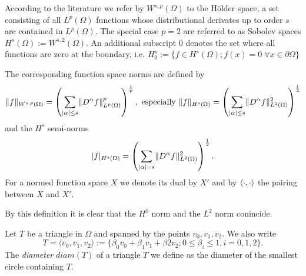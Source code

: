 \begin{definition} \label{def: function spaces and norms}
According to the literature we refer by $W^{s,p}(\Omega)$ to the H\"older space, a set consisting of all $L^p(\Omega)$ functions whose distributional derivates up to order $s$ are contained in $L^ p(\Omega)$.
 The special case $p=2$ are referred to as Sobolev spaces $H^s(\Omega):=W^{s,2}(\Omega)$. An additional subscript $0$ denotes the set where all functions are zero at the boundary, i.e. $H^s_0 :=\{f \in H^s(\Omega); f(x)=0 \; \forall x \in \partial \Omega\}$

The corresponding function space norms are defined by
\[
	\lVert f \rVert _{W^{s,p}(\Omega)} = \left( \sum_{|\alpha| \leq s} \lVert D^\alpha f \rVert^p_{L^p(\Omega)}\right)^{\frac 1 p }, \text{   especially } \lVert f \rVert _{H^{s}(\Omega)}=\left( \sum_{|\alpha| \leq s} \lVert D^\alpha f \rVert^2_{L^2(\Omega)}\right)^{\frac 1 2 }
\]
and the $H^s$ semi-norms
\[ 
 	|f|_{H^{s}(\Omega)}=\left( \sum_{|\alpha| = s} \lVert D^\alpha f \rVert^2_{L^2(\Omega)}\right)^{\frac 1 2 }.
\]
For a normed function space $X$ we denote its dual by $X'$ and by $ \langle \cdot, \cdot \rangle$ the pairing between $X$ and $X'$.

\end{definition}
By this definition it is clear that the $H^0$ norm and the $L^2$ norm conincide. 

Let $T$ be a triangle in $\Omega$ and spanned by the points $v_0, v_1, v_2$. We also write 
\[
	T= \langle v_0, v_1, v_2 \rangle := \{\beta_0 v_0+ \beta_1 v_1 +\beta2 v_2; 0 \leq \beta_i \leq 1, i= 0,1,2\}.
\]
The \emph{diameter} $diam(T)$ of a triangle $T$ we define as the diameter of the smallest circle containing $T$.

